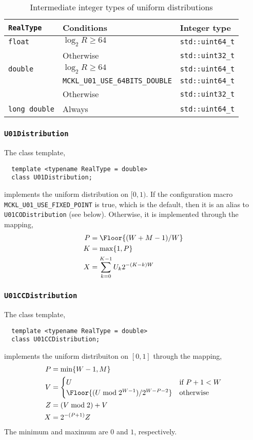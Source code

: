\begin{table}
  \begin{tabularx}{\textwidth}{LlL}
    \toprule
    \verb|RealType| & Conditions & Integer type \\
    \midrule
    \verb|float|  & $\log_2 R \ge 64$   & \verb|std::uint64_t| \\
                  & Otherwise           & \verb|std::uint32_t| \\
    \verb|double| & $\log_2 R \ge 64$   & \verb|std::uint64_t| \\
    & \verb|MCKL_U01_USE_64BITS_DOUBLE| & \verb|std::uint64_t| \\
    & Otherwise                         & \verb|std::uint32_t| \\
    \verb|long double| & Always         & \verb|std::uint64_t| \\
    \bottomrule
  \end{tabularx}
  \caption{Intermediate integer types of uniform distributions}
  \label{tab:Intermediate integer types of uniform distributions}
\end{table}

\subsubsection{\texttt{U01Distribution}}

The class template,
\begin{Verbatim}
  template <typename RealType = double>
  class U01Distribution;
\end{Verbatim}
implements the uniform distribution on $[0, 1)$. If the configuration macro
\verb|MCKL_U01_USE_FIXED_POINT| is true, which is the default, then it is an
alias to \verb|U01CODistribution| (see below). Otherwise, it is implemented
through the mapping,
\begin{align*}
  P &= \Floor{(W + M - 1) / W} \\
  K &= \max\{1, P\} \\
  X &= \sum_{k=0}^{K - 1} U_k 2^{-(K - k)W}
\end{align*}

\subsubsection{\texttt{U01CCDistribution}}

The class template,
\begin{Verbatim}
  template <typename RealType = double>
  class U01CCDistribution;
\end{Verbatim}
implements the uniform distribuiton on $[0, 1]$ through the mapping,
\begin{align*}
  P &= \min\{W - 1, M\} \\
  V &= \begin{cases}
    U &\text{if } P + 1 < W \\
    \Floor{(U \bmod 2^{W - 1}) / 2^{W - P -2}} &\text{otherwise}
  \end{cases} \\
  Z &= (V \bmod 2) + V \\
  X &= 2^{-(P + 1)} Z
\end{align*}
The minimum and maximum are $0$ and $1$, respectively.

